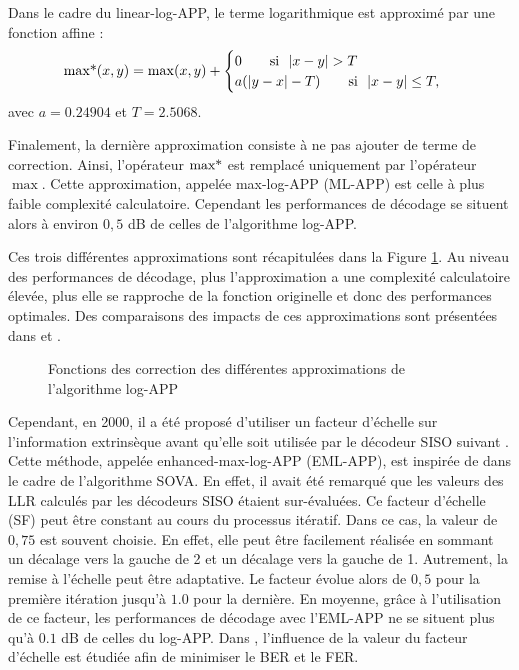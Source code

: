 Dans le cadre du linear-log-APP, le terme logarithmique est approximé par une fonction affine \cite{linearlog} : 
\begin{equation}
	\operatorname*{max*}(x,y)=\max(x,y) + \begin{cases} 0 \qquad\text{si~~} |x-y| > T \\
	a(|y-x|-T) \qquad\text{si~~} |x-y| \leq T, \end{cases}
\end{equation}
avec $a=0.24904$ et $T=2.5068$.

Finalement, la dernière approximation consiste à ne pas ajouter de terme de correction. Ainsi, l'opérateur $\operatorname*{max*}$ est remplacé uniquement par l'opérateur $\max$. Cette approximation, appelée max-log-APP (ML-APP) est celle à plus faible complexité calculatoire. Cependant les performances de décodage se situent alors à environ $0,5$ dB de celles de l'algorithme log-APP.

Ces trois différentes approximations sont récapitulées dans la Figure \ref{fig:logapprox}. Au niveau des performances de décodage, plus l'approximation a une complexité calculatoire élevée, plus elle se rapproche de la fonction originelle et donc des performances optimales. Des comparaisons des impacts de ces approximations sont présentées dans \cite{robertson1995comparison} et \cite{logapprox}.
\begin{figure}[!h]
	\centering
	
	\caption{\label{fig:logapprox} Fonctions des correction des différentes approximations de l'algorithme log-APP} 
\end{figure}

Cependant, en 2000, il a été proposé d'utiliser un facteur d'échelle sur l'information extrinsèque avant qu'elle soit utilisée par le décodeur SISO suivant \cite{enhancedmlmap}. Cette méthode, appelée enhanced-max-log-APP (EML-APP), est inspirée de \cite{HagenHoerViter} dans le cadre de l'algorithme SOVA. En effet, il avait été remarqué que les valeurs des LLR calculés par les décodeurs SISO étaient sur-évaluées.
Ce facteur d'échelle (SF) peut être constant au cours du processus itératif. Dans ce cas, la valeur de $0,75$ est souvent choisie. En effet, elle peut être facilement réalisée en sommant un décalage vers la gauche de 2 et un décalage vers la gauche de 1. Autrement, la remise à l'échelle peut être adaptative. Le facteur évolue alors de $0,5$ pour la première itération jusqu'à $1.0$ pour la dernière. En moyenne, grâce à l'utilisation de ce facteur, les performances de décodage avec l'EML-APP ne se situent plus qu'à $0.1$ dB de celles du log-APP.
Dans \cite{scaling}, l'influence de la valeur du facteur d'échelle est étudiée afin de minimiser le BER et le FER.


